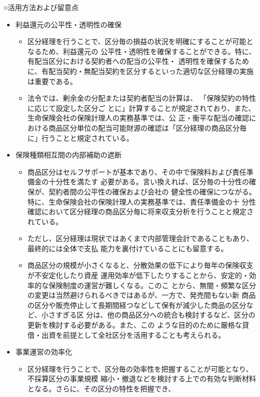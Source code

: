 \documentclass[report,gutter=10mm,fore-edge=10mm,uplatex,dvipdfmx]{jlreq}
\begin{document}
\noindent ○活用方法および留意点

\begin{itemize}
 \item[] 利益還元の公平性・透明性の確保
\begin{itemize}
\item[] 区分経理を行うことで、区分毎の損益の状況を明確にすることが可能となるため、利益還元の
 公平性・透明性を確保することができる。特に、有配当区分における契約者への配当の公平性・
 透明性を確保するために、有配当契約・無配当契約を区分するといった適切な区分経理の実施
 は重要である。
\item[] 法令では、剰余金の分配または契約者配当の計算は、
 「保険契約の特性に応じて設定した区分ご
 とに」計算することが規定されており、また、生命保険会社の保険計理人の実務基準では、公
 正・衡平な配当の確認における商品区分単位の配当可能財源の確認は「区分経理の商品区分毎
 に」行うことと規定されている。
\end{itemize}
 \item[] 保険種類相互間の内部補助の遮断
\begin{itemize}
\item[] 商品区分はセルフサポートが基本であり、その中で保険料および責任準備金の十分性を満たす
 必要がある。言い換えれば、区分毎の十分性の確保が、契約者間の公平性の確保および会社の
 健全性の確保につながる。特に、生命保険会社の保険計理人の実務基準では、責任準備金の十
 分性確認において区分経理の商品区分毎に将来収支分析を行うことと規定されている。
\item[] ただし、区分経理は現状ではあくまで内部管理会計であることもあり、最終的には全体で支払
 能力を裏付けていることにも留意する。
\item[] 商品区分の規模が小さくなると、分散効果の低下により毎年の保険収支が不安定化したり資産
 運用効率が低下したりすることから、安定的・効率的な保険制度の運営が難しくなる。このこ
 とから、無闇・頻繁な区分の変更は当然避けられるべきではあるが、一方で、発売間もない新
 商品の区分や販売停止して長期間経つなどして保有が減少した商品の区分など、小さすぎる区
 分は、他の商品区分への統合も検討するなど、区分の更新を検討する必要がある。また、この
 ような目的のために厳格な貸借・出資を前提として全社区分を活用することも考えられる。
\end{itemize}
 \item[] 事業運営の効率化
\begin{itemize}
\item[] 区分経理を行うことで、区分毎の効率性を把握することが可能となり、不採算区分の事業規模
 縮小・撤退などを検討する上での有効な判断材料となる。さらに、その区分の特性を把握でき、

\end{itemize}
\end{itemize}
\end{document}
